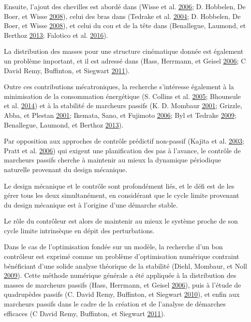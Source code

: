 \documentclass[french,A4paper,]{book}
\begin{document}
Ensuite, l'ajout des chevilles est abordé dans (Wisse et al.
\protect\hyperlink{ref-wisse06}{2006}; D. Hobbelen, De Boer, et Wisse
\protect\hyperlink{ref-hobbelen08}{2008}), celui des bras dans (Tedrake
et al. \protect\hyperlink{ref-tedrake04}{2004}; D. Hobbelen, De Boer, et
Wisse \protect\hyperlink{ref-hobbelen08}{2008}), et celui du cou et de
la tête dans (Benallegue, Laumond, et Berthoz
\protect\hyperlink{ref-benallegue13}{2013}; Falotico et al.
\protect\hyperlink{ref-falotico16}{2016}).

La distribution des masses pour une structure cinématique donnée est
également un problème important, et il est adressé dans (Hass, Herrmann,
et Geisel \protect\hyperlink{ref-hass06}{2006}; C David Remy, Buffinton,
et Siegwart \protect\hyperlink{ref-remy11}{2011}).

Outre ces contributions mécatroniques, la recherche s'intéresse
également à la minimisation de la consommation énergétique (S. Collins
et al. \protect\hyperlink{ref-collins05}{2005}; Bhounsule et al.
\protect\hyperlink{ref-bhounsule14}{2014}) et à la stabilité de
marcheurs passifs (K. D. Mombaur
\protect\hyperlink{ref-mombaur01}{2001}; Grizzle, Abba, et Plestan
\protect\hyperlink{ref-grizzle01}{2001}; Ikemata, Sano, et Fujimoto
\protect\hyperlink{ref-ikemata06}{2006}; Byl et Tedrake
\protect\hyperlink{ref-byl09}{2009}; Benallegue, Laumond, et Berthoz
\protect\hyperlink{ref-benallegue13}{2013}).

Par opposition aux approches de contrôle prédictif non-passif (Kajita et
al. \protect\hyperlink{ref-kajita03}{2003}; Pratt et al.
\protect\hyperlink{ref-pratt06}{2006}) qui exigent une planification des
pas à l'avance, le contrôle de marcheurs passifs cherche à maintenir au
mieux la dynamique périodique naturelle provenant du design mécanique.

Le design mécanique et le contrôle sont profondément liés, et le défi
est de les gérer tous les deux simultanément, en considérant que le
cycle limite provenant du design mécanique est à l'origine d'une
démarche stable.

Le rôle du contrôleur est alors de maintenir au mieux le système proche
de son cycle limite intrinsèque en dépit des perturbations.

Dans le cas de l'optimisation fondée sur un modèle, la recherche d'un
bon contrôleur est exprimé comme un problème d'optimisation numérique
contraint bénéficiant d'une solide analyse théorique de la stabilité
(Diehl, Mombaur, et Noll \protect\hyperlink{ref-diehl09}{2009}). Cette
méthode numérique générale a été appliquée à la distribution des masses
de marcheurs passifs (Hass, Herrmann, et Geisel
\protect\hyperlink{ref-hass06}{2006}), puis à l'étude de quadrupèdes
passifs (C. David Remy, Buffinton, et Siegwart
\protect\hyperlink{ref-remy10}{2010}), et enfin aux marcheurs passifs
dans le cadre de la création et de l'analyse de démarches efficaces (C
David Remy, Buffinton, et Siegwart
\protect\hyperlink{ref-remy11}{2011}).
\end{document}
